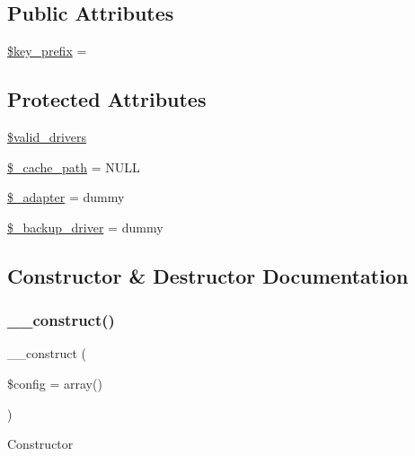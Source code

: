 \subsection*{Public Attributes}
\begin{DoxyCompactItemize}
\item 
\mbox{\hyperlink{class_c_i___cache_ac5ae5bfe56bac385a2687d7503487f38}{\$key\+\_\+prefix}} = \textquotesingle{}\textquotesingle{}
\end{DoxyCompactItemize}
\subsection*{Protected Attributes}
\begin{DoxyCompactItemize}
\item 
\mbox{\hyperlink{class_c_i___cache_a32d963b3d49fd67f188c1a74d38be6df}{\$valid\+\_\+drivers}}
\item 
\mbox{\hyperlink{class_c_i___cache_ae9407d6ae1ddd132cca3c7f855f89dfe}{\$\+\_\+cache\+\_\+path}} = N\+U\+LL
\item 
\mbox{\hyperlink{class_c_i___cache_a465f293474a3bbb7341af052f7de13d7}{\$\+\_\+adapter}} = \textquotesingle{}dummy\textquotesingle{}
\item 
\mbox{\hyperlink{class_c_i___cache_a6e11e902e473d1345a4caa11236ac828}{\$\+\_\+backup\+\_\+driver}} = \textquotesingle{}dummy\textquotesingle{}
\end{DoxyCompactItemize}


\subsection{Constructor \& Destructor Documentation}
\mbox{\label{class_c_i___cache_af7f9493844d2d66e924e3c1df51ce616}} 
\subsubsection{\texorpdfstring{\+\_\+\+\_\+construct()}{\_\_construct()}}
{\footnotesize\ttfamily \+\_\+\+\_\+construct (\begin{DoxyParamCaption}\item[{}]{\$config = {\ttfamily array()} }\end{DoxyParamCaption})}

Constructor

